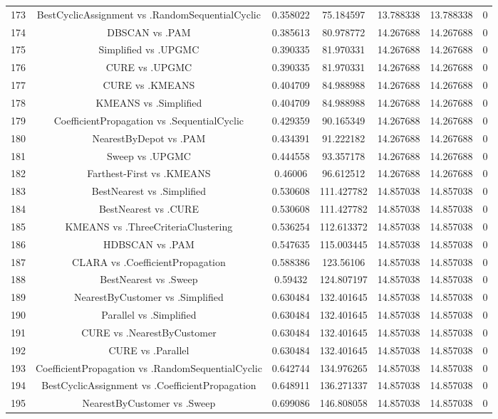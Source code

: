 \documentclass[a4paper,10pt]{article}
\begin{document}
\begin{landscape}
\begin{table}[!htp]
\begin{tabular}{ccccccc}
173&BestCyclicAssignment vs .RandomSequentialCyclic&0.358022&75.184597&13.788338&13.788338&0\\
174&DBSCAN vs .PAM&0.385613&80.978772&14.267688&14.267688&0\\
175&Simplified vs .UPGMC&0.390335&81.970331&14.267688&14.267688&0\\
176&CURE vs .UPGMC&0.390335&81.970331&14.267688&14.267688&0\\
177&CURE vs .KMEANS&0.404709&84.988988&14.267688&14.267688&0\\
178&KMEANS vs .Simplified&0.404709&84.988988&14.267688&14.267688&0\\
179&CoefficientPropagation vs .SequentialCyclic&0.429359&90.165349&14.267688&14.267688&0\\
180&NearestByDepot vs .PAM&0.434391&91.222182&14.267688&14.267688&0\\
181&Sweep vs .UPGMC&0.444558&93.357178&14.267688&14.267688&0\\
182&Farthest-First vs .KMEANS&0.46006&96.612512&14.267688&14.267688&0\\
183&BestNearest vs .Simplified&0.530608&111.427782&14.857038&14.857038&0\\
184&BestNearest vs .CURE&0.530608&111.427782&14.857038&14.857038&0\\
185&KMEANS vs .ThreeCriteriaClustering&0.536254&112.613372&14.857038&14.857038&0\\
186&HDBSCAN vs .PAM&0.547635&115.003445&14.857038&14.857038&0\\
187&CLARA vs .CoefficientPropagation&0.588386&123.56106&14.857038&14.857038&0\\
188&BestNearest vs .Sweep&0.59432&124.807197&14.857038&14.857038&0\\
189&NearestByCustomer vs .Simplified&0.630484&132.401645&14.857038&14.857038&0\\
190&Parallel vs .Simplified&0.630484&132.401645&14.857038&14.857038&0\\
191&CURE vs .NearestByCustomer&0.630484&132.401645&14.857038&14.857038&0\\
192&CURE vs .Parallel&0.630484&132.401645&14.857038&14.857038&0\\
193&CoefficientPropagation vs .RandomSequentialCyclic&0.642744&134.976265&14.857038&14.857038&0\\
194&BestCyclicAssignment vs .CoefficientPropagation&0.648911&136.271337&14.857038&14.857038&0\\
195&NearestByCustomer vs .Sweep&0.699086&146.808058&14.857038&14.857038&0\\

\end{tabular}
\end{table}
\end{landscape}
\end{document}
